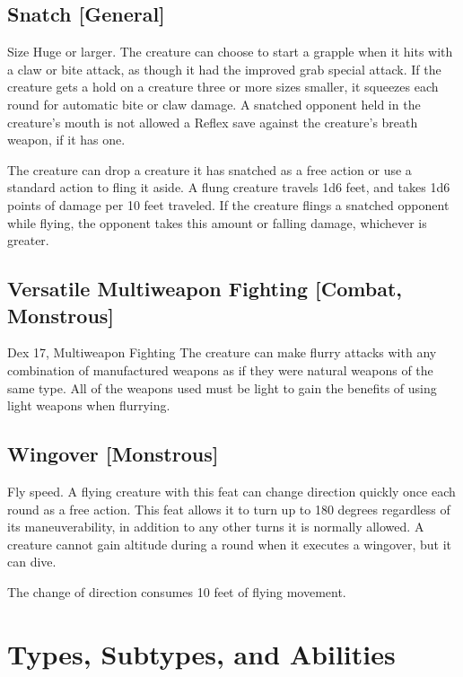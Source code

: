 \subsection{Snatch [General]}
 Size Huge or larger.
 The creature can choose to start a grapple  when it hits with a claw or bite attack, as though it had the improved grab special attack. If the creature gets a hold on a creature three or more sizes smaller, it squeezes each round for automatic bite or claw damage. A snatched opponent held in the creature's mouth is not allowed a Reflex save against the creature's breath weapon, if it has one.

The creature can drop a creature it has snatched as a free action or use a standard action to fling it aside. A flung creature travels 1d6  feet, and takes 1d6 points of damage per 10 feet traveled. If the creature flings a snatched opponent while flying, the opponent takes this amount or falling damage, whichever is greater.


\subsection{Versatile Multiweapon Fighting [Combat, Monstrous]}
 Dex 17, Multiweapon Fighting
 The creature can make flurry attacks with any combination of manufactured weapons as if they were natural weapons of the same type. All of the weapons used must be light to gain the benefits of using light weapons when flurrying.


\subsection{Wingover [Monstrous]}
 Fly speed.
 A flying creature with this feat can change direction quickly once each round as a free action. This feat allows it to turn up to 180 degrees regardless of its maneuverability, in addition to any other turns it is normally allowed. A creature cannot gain altitude during a round when it executes a wingover, but it can dive.

The change of direction consumes 10 feet of flying movement.

\section{Types, Subtypes, and Abilities}


